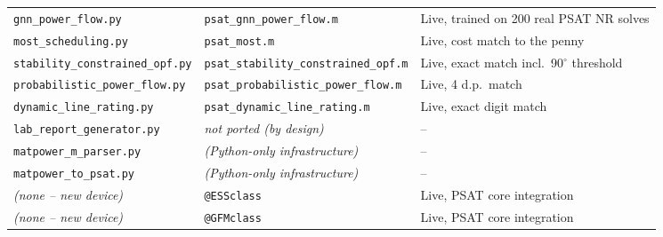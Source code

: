 \documentclass[11pt]{report}
\newcommand{\pkg}[1]{\texttt{#1}}
\theoremstyle{plain}
\theoremstyle{definition}
\theoremstyle{remark}
\begin{document}
\begin{longtable}{@{}p{5cm}p{5.5cm}p{4cm}@{}}
\pkg{gnn\_\hspace{0pt}power\_\hspace{0pt}flow.py} & \pkg{psat\_\hspace{0pt}gnn\_\hspace{0pt}power\_\hspace{0pt}flow.m} & Live, trained on 200 real PSAT NR solves \\
\pkg{most\_\hspace{0pt}scheduling.py} & \pkg{psat\_\hspace{0pt}most.m} & Live, cost match to the penny \\
\pkg{stability\_\hspace{0pt}constrained\_\hspace{0pt}opf.py} & \pkg{psat\_\hspace{0pt}stability\_\hspace{0pt}constrained\_\hspace{0pt}opf.m} & Live, exact match incl.\ 90$^\circ$ threshold \\
\pkg{probabilistic\_\hspace{0pt}power\_\hspace{0pt}flow.py} & \pkg{psat\_\hspace{0pt}probabilistic\_\hspace{0pt}power\_\hspace{0pt}flow.m} & Live, 4 d.p.\ match \\
\pkg{dynamic\_\hspace{0pt}line\_\hspace{0pt}rating.py} & \pkg{psat\_\hspace{0pt}dynamic\_\hspace{0pt}line\_\hspace{0pt}rating.m} & Live, exact digit match \\
\pkg{lab\_\hspace{0pt}report\_\hspace{0pt}generator.py} & \emph{not ported (by design)} & -- \\
\pkg{matpower\_\hspace{0pt}m\_\hspace{0pt}parser.py} & \emph{(Python-only infrastructure)} & -- \\
\pkg{matpower\_\hspace{0pt}to\_\hspace{0pt}psat.py} & \emph{(Python-only infrastructure)} & -- \\
\emph{(none -- new device)} & \pkg{@ESSclass} & Live, PSAT core integration \\
\emph{(none -- new device)} & \pkg{@GFMclass} & Live, PSAT core integration \\
\bottomrule
\end{longtable}
\end{document}
